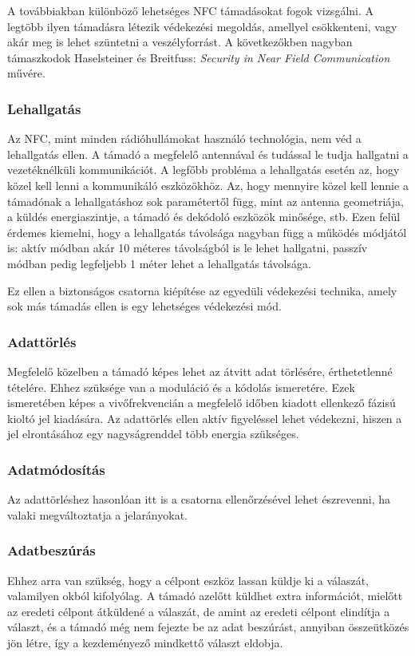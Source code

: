\documentclass[12pt]{article}
\begin{document}
A továbbiakban különböző lehetséges NFC támadásokat fogok vizsgálni. A legtöbb
ilyen támadásra létezik védekezési megoldás, amellyel csökkenteni, vagy akár 
meg is lehet szüntetni a veszélyforrást. A következőkben nagyban támaszkodok
Haselsteiner és Breitfuss: \emph{Security in Near Field Communication} művére. 

\subsubsection{Lehallgatás}
Az NFC, mint minden rádióhullámokat használó technológia, nem véd a lehallgatás
ellen. A támadó a megfelelő antennával és tudással le tudja hallgatni a 
vezetéknélküli kommunikációt. A legfőbb probléma a lehallgatás esetén az, 
hogy közel kell lenni a kommunikáló eszközökhöz. Az, hogy mennyire közel kell
lennie a támadónak a lehallgatáshoz sok paramétertől függ, mint az antenna 
geometriája, a küldés energiaszintje, a támadó és dekódoló eszközök minősége, stb.
Ezen felül érdemes kiemelni, hogy a lehallgatás távolsága nagyban függ a működés
módjától is: aktív módban akár 10 méteres távolságból is le lehet hallgatni, 
passzív módban pedig legfeljebb 1 méter lehet a lehallgatás távolsága.

Ez ellen a biztonságos csatorna kiépítése az egyedüli védekezési technika, 
amely sok más támadás ellen is egy lehetséges védekezési mód.

\subsubsection{Adattörlés}
Megfelelő közelben a támadó képes lehet az átvitt adat törlésére, érthetetlenné
tételére. Ehhez szüksége van a moduláció és a kódolás ismeretére. Ezek ismeretében
képes a vivőfrekvencián a megfelelő időben kiadott ellenkező fázisú kioltó jel
kiadására. 
Az adattörlés ellen aktív figyeléssel lehet védekezni, hiszen a jel elrontásához
egy nagyságrenddel több energia szükséges.

\subsubsection{Adatmódosítás}
Az adattörléshez hasonlóan itt is a csatorna ellenőrzésével lehet észrevenni,
ha valaki megváltoztatja a jelarányokat.

\subsubsection{Adatbeszúrás}
Ehhez arra van szükség, hogy a célpont eszköz lassan küldje ki a válaszát, 
valamilyen okból kifolyólag. A támadó azelőtt küldhet extra információt, mielőtt
az eredeti célpont átküldené a válaszát, de amint az eredeti célpont elindítja a
választ, és a támadó még nem fejezte be az adat beszúrást, annyiban összeütközés
jön létre, így a kezdeményező mindkettő választ eldobja.
\end{document}
